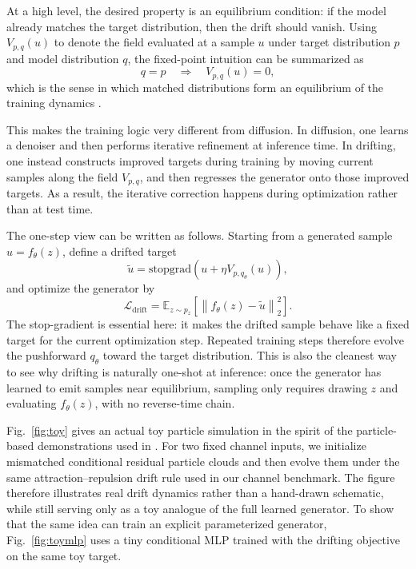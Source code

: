 \documentclass[conference]{IEEEtran}
\begin{document}
At a high level, the desired property is an equilibrium condition:
if the model already matches the target distribution, then the drift should vanish.
Using \(V_{p,q}(u)\) to denote the field evaluated at a sample \(u\) under target distribution \(p\) and model distribution \(q\), the fixed-point intuition can be summarized as
\begin{equation}
q = p
\quad \Longrightarrow \quad
V_{p,q}(u) = 0,
\end{equation}
which is the sense in which matched distributions form an equilibrium of the training dynamics \cite{drifting}.

This makes the training logic very different from diffusion.
In diffusion, one learns a denoiser and then performs iterative refinement at inference time.
In drifting, one instead constructs improved targets during training by moving current samples along the field \(V_{p,q}\), and then regresses the generator onto those improved targets.
As a result, the iterative correction happens during optimization rather than at test time.

The one-step view can be written as follows.
Starting from a generated sample \(u = f_\theta(z)\), define a drifted target
\begin{equation}
\tilde{u}
=
\mathrm{stopgrad}\!\left(
u + \eta V_{p,q_\theta}(u)
\right),
\end{equation}
and optimize the generator by
\begin{equation}
\mathcal{L}_{\text{drift}}
=
\mathbb{E}_{z \sim p_z}
\left[
\left\|
f_\theta(z) - \tilde{u}
\right\|_2^2
\right].
\end{equation}
The stop-gradient is essential here: it makes the drifted sample behave like a fixed target for the current optimization step.
Repeated training steps therefore evolve the pushforward \(q_\theta\) toward the target distribution.
This is also the cleanest way to see why drifting is naturally one-shot at inference:
once the generator has learned to emit samples near equilibrium, sampling only requires drawing \(z\) and evaluating \(f_\theta(z)\), with no reverse-time chain.

Fig.~\ref{fig:toy} gives an actual toy particle simulation in the spirit of the particle-based demonstrations used in \cite{drifting}.
For two fixed channel inputs, we initialize mismatched conditional residual particle clouds and then evolve them under the same attraction--repulsion drift rule used in our channel benchmark.
The figure therefore illustrates real drift dynamics rather than a hand-drawn schematic, while still serving only as a toy analogue of the full learned generator.
To show that the same idea can train an explicit parameterized generator, Fig.~\ref{fig:toymlp} uses a tiny conditional MLP trained with the drifting objective on the same toy target.
\end{document}
